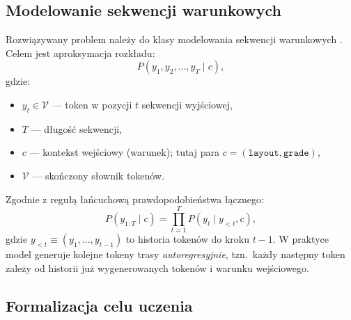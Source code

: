\documentclass[12pt,a4paper]{article}
\begin{document}
\subsection{Modelowanie sekwencji warunkowych}
\label{sec:cond-seq}

Rozwiązywany problem należy do klasy modelowania sekwencji warunkowych \citep{bengio2003nlm,sutskever2014seq2seq}. Celem jest aproksymacja rozkładu:
\begin{equation}
P(y_1, y_2, \dots, y_T \mid c),
\end{equation}
gdzie:
\begin{itemize}[leftmargin=1.5em]
    \item $y_t \in \mathcal{V}$ --- token w pozycji $t$ sekwencji wyjściowej,
    \item $T$ --- długość sekwencji,
    \item $c$ --- kontekst wejściowy (warunek); tutaj para $c = (\texttt{layout}, \texttt{grade})$,
    \item $\mathcal{V}$ --- skończony słownik tokenów.
\end{itemize}
Zgodnie z regułą łańcuchową prawdopodobieństwa łącznego:
\begin{equation}
P(y_{1:T}\mid c) = \prod_{t=1}^{T} P(y_t \mid y_{<t}, c),
\end{equation}
gdzie $y_{<t} \equiv (y_1,\dots,y_{t-1})$ to historia tokenów do kroku $t-1$. W praktyce model generuje kolejne tokeny trasy \emph{autoregresyjnie}, tzn.\ każdy następny token zależy od historii już wygenerowanych tokenów i warunku wejściowego.

\subsection{Formalizacja celu uczenia}
\label{sec:loss}
\end{document}
